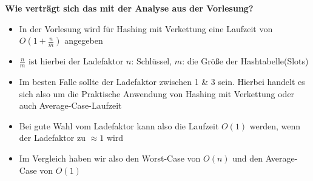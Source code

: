 \noindent
\textbf{Wie verträgt sich das mit der Analyse aus der Vorlesung?}
\begin{itemize}
	\item In der Vorlesung wird für Hashing mit Verkettung eine Laufzeit von $O(1+ \frac{n}{m})$ angegeben
	\item $\frac{n}{m}$ ist hierbei der Ladefaktor $n$: Schlüssel, $m$: die Größe der Hashtabelle(Slots)
	\item Im besten Falle sollte der Ladefaktor zwischen 1 \& 3 sein. Hierbei handelt es sich also um die Praktische Anwendung von Hashing mit Verkettung oder auch Average-Case-Laufzeit
	\item Bei gute Wahl vom Ladefaktor kann also die Laufzeit $O(1)$ werden, wenn der Ladefaktor zu $\approx 1$ wird
	\item Im Vergleich haben wir also den Worst-Case von $O(n)$ und den Average-Case von $O(1)$
\end{itemize}